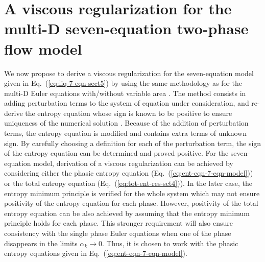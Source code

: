 \documentclass[preprint,10pt]{elsarticle}
\newcommand{\eqt}[1]{Eq.~(\ref{#1})}                     %
\begin{document}
\section{A viscous regularization for the multi-D seven-equation two-phase flow model}\label{sec:visc-regu}
%
We now propose to derive a viscous regularization for the seven-equation model given in \eqt{eq:liq-7-eqn-sect5} by using the same methodology as for the multi-D Euler equations with/without variable area \cite{jlg, Marco_paper_low_mach}. The method consists in adding perturbation terms to the system of equation under consideration, and re-derive the entropy equation whose sign is known to be positive to ensure uniqueness of the numerical solution \cite{Leveque}. Because of the addition of perturbation terms, the entropy equation is modified and contains extra terms of unknown sign. By carefully choosing a definition for each of the perturbation term, the sign of the entropy equation can be determined and proved positive. For the seven-equation model, derivation of a viscous regularization can be achieved by considering either the phasic entropy equation (\eqt{eq:ent-eqn-7-eqn-model}) or the total entropy equation (\eqt{eq:tot-ent-res-sct4}). In the later case, the entropy minimum principle is verified for the whole system which may not ensure positivity of the entropy equation for each phase. However, positivity of the total entropy equation can be also achieved by assuming that the entropy minimum principle holds for each phase. This stronger requirement will also ensure consistency with the single phase Euler equations when one of the phase disappears in the limits $\alpha_k \to 0$. Thus, it is chosen to work with the phasic entropy equations given in \eqt{eq:ent-eqn-7-eqn-model}.
\end{document}
